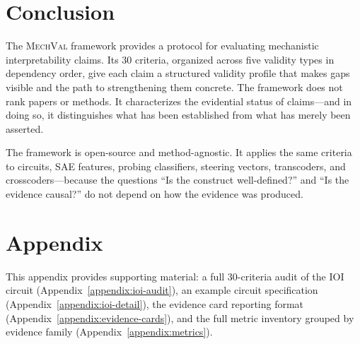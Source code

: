 \documentclass{article}
\newcommand{\mechval}{\textsc{MechVal}}
\begin{document}
\section{Conclusion}
\label{sec:conclusion}

The \mechval{} framework provides a protocol for evaluating mechanistic interpretability claims. Its 30 criteria, organized across five validity types in dependency order, give each claim a structured validity profile that makes gaps visible and the path to strengthening them concrete. The framework does not rank papers or methods. It characterizes the evidential status of claims---and in doing so, it distinguishes what has been established from what has merely been asserted.

The framework is open-source and method-agnostic. It applies the same criteria to circuits, SAE features, probing classifiers, steering vectors, transcoders, and crosscoders---because the questions ``Is the construct well-defined?'' and ``Is the evidence causal?'' do not depend on how the evidence was produced.

%
%



\nocite{campbell1963experimental,loevinger1957objective}



\clearpage
\appendix
\section{Appendix}

This appendix provides supporting material: a full 30-criteria audit of the IOI circuit
(Appendix~\ref{appendix:ioi-audit}), an example circuit specification
(Appendix~\ref{appendix:ioi-detail}), the evidence card reporting format
(Appendix~\ref{appendix:evidence-cards}), and the full metric inventory grouped by
evidence family (Appendix~\ref{appendix:metrics}).
\end{document}
